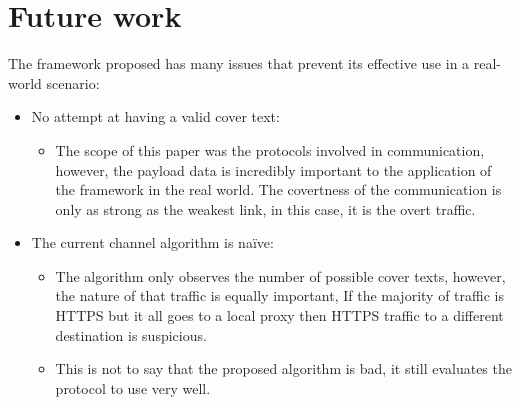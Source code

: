 \chapter{Future work}

The framework proposed has many issues that prevent its effective use in a real-world scenario:

\begin{itemize}
    \item No attempt at having a valid cover text:
    \begin{itemize}
        \item The scope of this paper was the protocols involved in communication, however, the payload data is incredibly important to the application of the framework in the real world. The covertness of the communication is only as strong as the weakest link, in this case, it is the overt traffic.
    \end{itemize}
    \item The current channel algorithm is na\"ive:
    \begin{itemize}
        \item The algorithm only observes the number of possible cover texts, however, the nature of that traffic is equally important, If the majority of traffic is HTTPS but it all goes to a local proxy then HTTPS traffic to a different destination is suspicious.
        \item This is not to say that the proposed algorithm is bad, it still evaluates the protocol to use very well.
    \end{itemize}
\end{itemize}